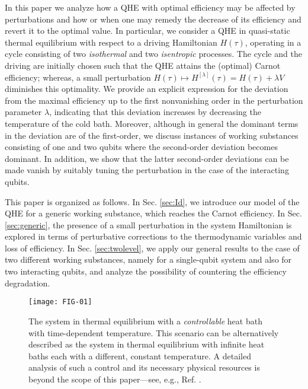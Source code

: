 \documentclass[aps,pra,floatfix,twocolumn,groupedaddress,superscriptaddress,nofootinbib,notitlepage,amsmath,amssymb,]{revtex4-1}
\begin{document}
In this paper we analyze how a QHE with optimal efficiency may be affected by perturbations and how or when one may remedy the decrease of its efficiency and revert it to the optimal value. In particular, we consider a QHE in quasi-static thermal equilibrium with respect to a driving Hamiltonian $H(\tau)$, operating in a cycle consisting of two \textit{isothermal} and two \textit{isentropic} processes. The cycle and the driving are initially chosen such that the QHE attains the (optimal) Carnot efficiency; whereas, a small perturbation $H(\tau)\mapsto H^{[\lambda]}(\tau)=H(\tau)+\lambda V$ diminishes this optimality. We provide an explicit expression for the deviation from the maximal efficiency up to the first nonvanishing order in the perturbation parameter $\lambda$, indicating that this deviation increases by decreasing the temperature of the cold bath. Moreover, although in general the dominant terms in the deviation are of the first-order, we discuss instances of working substances consisting of one and two qubits where the second-order deviation becomes dominant. In addition, we show that the latter second-order deviations can be made vanish by suitably tuning the perturbation in the case of the interacting qubits.

This paper is organized as follows. In Sec. \ref{sec:Id}, we introduce our model of the QHE for a generic working substance, which reaches the Carnot efficiency. In Sec. \ref{sec:generic}, the presence of a small perturbation in the system Hamiltonian is explored in terms of perturbative corrections to the thermodynamic variables and loss of efficiency. In Sec. \ref{sec:twolevel}, we apply our general results to the case of two different working substances, namely for a single-qubit system and also for two interacting qubits, and analyze the possibility of countering the efficiency degradation.


\begin{figure*}[tp]
	\texttt{[image: FIG-01]} 
	\caption{The system in thermal equilibrium with a \textit{controllable} heat bath with time-dependent temperature. This scenario  can be alternatively described as the system in thermal equilibrium with infinite heat baths each with a different, constant temperature. A detailed analysis of such a control and its necessary physical resources is beyond the scope of this paper---see, e.g., Ref. \cite{Callen}.}
	\label{fig-new}
\end{figure*}
\end{document}
